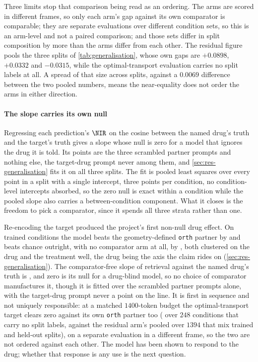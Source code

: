 Three limits stop that comparison being read as an ordering. The arms are scored
in different frames, so only each arm's gap against its own comparator is
comparable; they are separate evaluations over different condition sets, so this
is an arm-level and not a paired comparison; and those sets differ in split
composition by more than the arms differ from each other. The residual figure
pools the three splits of \cref{tab:generalisation}, whose own gaps are
$+0.0898$, $+0.0332$ and $-0.0315$, while the optimal-transport evaluation
carries no split labels at all. A spread of that size across splits, against a
$0.0069$ difference between the two pooled numbers, means the near-equality does
not order the arms in either direction.

\paragraph{The slope carries its own null} Regressing each prediction's $\NIR$
on the cosine between the named drug's truth and the target's truth gives a
slope whose null is zero for a model that ignores the drug it is told. Its
points are the three scrambled partner prompts and nothing else, the target-drug
prompt never among them, and \cref{sec:res-generalisation} fits it on all three
splits. The fit is pooled least squares over every point in a split with a
single intercept, three points per condition, no condition-level intercepts
absorbed, so the zero null is exact within a condition while the pooled slope
also carries a between-condition component. What it closes is the freedom to
pick a comparator, since it spends all three strata rather than one.

\begin{claim}
Re-encoding the target produced the project's first non-null drug effect. On
trained conditions the model beats the geometry-defined \texttt{orth} partner by
 and beats chance outright, with no comparator arm
at all, by , both clustered on the drug and the
treatment well, the drug being the axis the claim rides on
(\cref{sec:res-generalisation}). The comparator-free slope of retrieval against
the named drug's truth is , and zero is its null for a
drug-blind model, so no choice of comparator manufactures it, though it is fitted over the
scrambled partner prompts alone, with the target-drug prompt never a point on the
line. It is first in sequence and not uniquely responsible: at a matched
$1400$-token budget the optimal-transport target clears zero against its own
\texttt{orth} partner too ( over $\num{248}$
conditions that carry no split labels, against the residual arm's
 pooled over $\num{1394}$ that mix trained and
held-out splits), on a separate evaluation in a different frame, so the two are
not ordered against each other. The model has been shown to respond to the drug;
whether that response is any use is the next question.
\end{claim}


